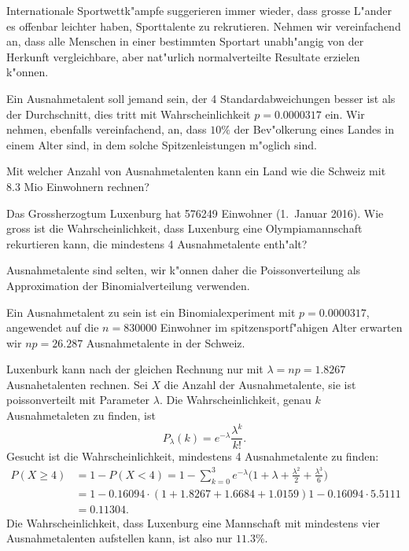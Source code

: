Internationale Sportwettk"ampfe suggerieren immer wieder, dass grosse
L"ander es offenbar leichter haben, Sporttalente zu rekrutieren.
Nehmen wir vereinfachend an, dass alle Menschen in einer
bestimmten Sportart unabh"angig von der Herkunft vergleichbare,
aber nat"urlich normalverteilte Resultate erzielen k"onnen.

Ein Ausnahmetalent soll jemand sein, der 4 Standardabweichungen besser ist
als der Durchschnitt, dies tritt mit Wahrscheinlichkeit $p = 0.0000317$ ein.
Wir nehmen, ebenfalls vereinfachend, an, dass $10\%$ der Bev"olkerung
eines Landes in einem Alter sind, in dem solche Spitzenleistungen
m"oglich sind.
\begin{teilaufgaben}
\item
Mit welcher Anzahl von Ausnahmetalenten kann ein Land wie die Schweiz mit 
8.3 Mio Einwohnern rechnen?
\item
Das Grossherzogtum Luxenburg hat 576249 Einwohner (1.~Januar 2016).
Wie gross ist die Wahrscheinlichkeit, dass Luxenburg eine Olympiamannschaft
rekurtieren kann, die mindestens 4 Ausnahmetalente enth"alt?
\end{teilaufgaben}

\begin{loesung}
Ausnahmetalente sind selten, wir k"onnen daher die Poissonverteilung als
Approximation der Binomialverteilung verwenden.
\begin{teilaufgaben}
\item
Ein Ausnahmetalent zu sein ist ein Binomialexperiment mit $p=0.0000317$,
angewendet auf die $n=830000$ Einwohner im spitzensportf"ahigen Alter
erwarten wir $np=26.287$ Ausnahmetalente in der Schweiz.
\item
Luxenburk kann nach der gleichen Rechnung nur mit $\lambda=np=1.8267$
Ausnahetalenten rechnen.
Sei $X$ die Anzahl der Ausnahmetalente, sie ist poissonverteilt mit
Parameter $\lambda$.
Die Wahrscheinlichkeit, genau $k$ Ausnahmetaleten zu finden, ist
\[
P_\lambda(k)=e^{-\lambda}\frac{\lambda^k}{k!}.
\]
Gesucht ist die Wahrscheinlichkeit, mindestens 4 Ausnahmetalente zu finden:
\begin{align*}
P(X \ge 4)
&=
1-P(X<4)=1-\sum_{k=0}^3 e^{-\lambda}\biggl(
1+\lambda+ \frac{\lambda^2}{2} + \frac{\lambda^3}{6}
\biggr)
\\
&=
1-0.16094\cdot(1+1.8267+1.6684+1.0159)1-0.16094\cdot 5.5111\\
&=
0.11304.
\end{align*}
Die Wahrscheinlichkeit, dass Luxenburg eine Mannschaft mit mindestens
vier Ausnahmetalenten aufstellen kann, ist also nur $11.3\%$.
\end{teilaufgaben}
\end{loesung}

\begin{bewertung}
\end{bewertung}

